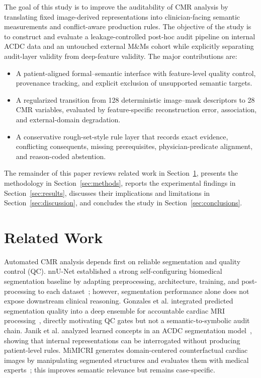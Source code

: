 \documentclass{ceurart}
\begin{document}
The goal of this study is to improve the auditability of CMR analysis by translating fixed image-derived representations into clinician-facing semantic measurements and conflict-aware production rules. The objective of the study is to construct and evaluate a leakage-controlled post-hoc audit pipeline on internal ACDC data and an untouched external M\&Ms cohort while explicitly separating audit-layer validity from deep-feature validity. The major contributions are:
\begin{itemize}[leftmargin=*,nosep]
  \item A patient-aligned formal--semantic interface with feature-level quality control, provenance tracking, and explicit exclusion of unsupported semantic targets.
  \item A regularized transition from 128 deterministic image--mask descriptors to 28 CMR variables, evaluated by feature-specific reconstruction error, association, and external-domain degradation.
  \item A conservative rough-set-style rule layer that records exact evidence, conflicting consequents, missing prerequisites, physician-predicate alignment, and reason-coded abstention.
\end{itemize}

The remainder of this paper reviews related work in Section~\ref{sec:related_work}, presents the methodology in Section~\ref{sec:methods}, reports the experimental findings in Section~\ref{sec:results}, discusses their implications and limitations in Section~\ref{sec:discussion}, and concludes the study in Section~\ref{sec:conclusions}.

\section{Related Work}\label{sec:related_work}

Automated CMR analysis depends first on reliable segmentation and quality control (QC). nnU-Net established a strong self-configuring biomedical segmentation baseline by adapting preprocessing, architecture, training, and post-processing to each dataset~\cite{Isensee2021NnUNet}; however, segmentation performance alone does not expose downstream clinical reasoning. Gonzales et al. integrated predicted segmentation quality into a deep ensemble for accountable cardiac MRI processing~\cite{Gonzales2023QualityControl}, directly motivating QC gates but not a semantic-to-symbolic audit chain. Janik et al. analyzed learned concepts in an ACDC segmentation model~\cite{Janik2021Interpretability}, showing that internal representations can be interrogated without producing patient-level rules. MiMICRI generates domain-centered counterfactual cardiac images by manipulating segmented structures and evaluates them with medical experts~\cite{Guo2024MiMICRI}; this improves semantic relevance but remains case-specific.
\end{document}
